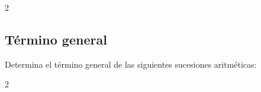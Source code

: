 \documentclass[12pt,addpoints]{evalua}
\begin{document}
\begin{questions}
\begin{multicols}{2}
      \end{multicols}
      
	\subsection*{Término general}
    
      \question[4] Determina el término general de las siguientes sucesiones aritméticas:
   
      \begin{multicols}{2}
\end{multicols}
\end{questions}
\end{document}

